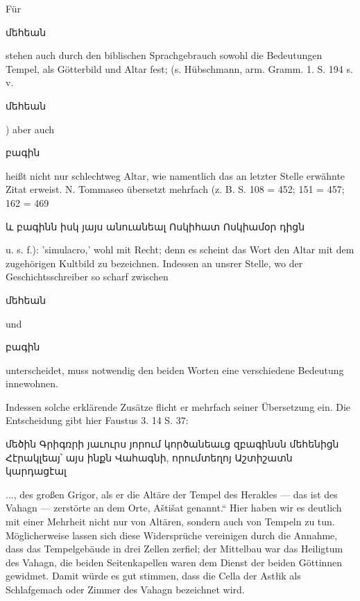 \documentclass{article}
\begin{document}
{\begin{table}[H]
\end{table}\hspace*{5mm}Für \begin{armenian}մեհեան\end{armenian} stehen auch durch den biblischen Sprachgebrauch sowohl die Bedeutungen Tempel, als Götterbild und Altar fest; (s. Hübschmann, arm. Gramm. 1. S. 194 s. v. \begin{armenian}մեհեան\end{armenian}) aber auch \begin{armenian}բագին\end{armenian} heißt nicht nur schlechtweg Altar, wie namentlich das an letzter Stelle erwähnte Zitat erweist. N. Tommaseo übersetzt mehrfach (z. B. S. 108 = 452; 151 = 457; 162 = 469 \begin{armenian}և բագինն իսկ յայս անուանեալ Ոսկիհատ Ոսկիամօր դիցն\end{armenian} u. s. f.): 'simulacro,' wohl mit Recht; denn es scheint das Wort den Altar mit dem zugehörigen Kultbild zu bezeichnen. Indessen an unsrer Stelle, wo der Geschichtsschreiber so scharf zwischen \begin{armenian}մեհեան\end{armenian} und \begin{armenian}բագին\end{armenian} unterscheidet, muss notwendig den beiden Worten eine verschiedene Bedeutung innewohnen.} Indessen solche erklärende Zusätze flicht er mehrfach seiner Übersetzung ein. Die Entscheidung gibt hier Faustus 3. 14 S. 37: \begin{armenian}մեծին Գրիգռրի յաւուրս յորում կործանեաւց զբագինսն մեհենիցն Հէրակլեայ՝ այս ինքն Վահագնի, որումտեղոյ Աշտիշատն կարդացէալ\end{armenian}..., des großen Grigor, als er die Altäre der Tempel des Herakles — das ist des Vahagn — zerstörte an dem Orte, Aštišat genannt.“ Hier haben wir es deutlich mit einer Mehrheit nicht nur von Altären, sondern auch von Tempeln zu tun. Möglicherweise lassen sich diese Widersprüche vereinigen durch die Annahme, dass das Tempelgebäude in drei Zellen zerfiel; der Mittelbau war das Heiligtum des Vahagn, die beiden Seitenkapellen waren dem Dienst der beiden Göttinnen gewidmet. Damit würde es gut stimmen, dass die Cella der Astłik als Schlafgemach oder Zimmer des Vahagn bezeichnet wird.
\end{document}
